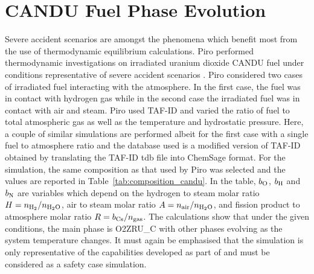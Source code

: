 \section{CANDU Fuel Phase Evolution}
Severe accident scenarios are amongst the phenomena which benefit most from the use of thermodynamic equilibrium calculations. Piro performed thermodynamic investigations on irradiated uranium dioxide CANDU fuel under conditions representative of severe accident scenarios \cite{Piro:2022aa}. Piro considered two cases of irradiated fuel interacting with the atmosphere. In the first case, the fuel was in contact with hydrogen gas while in the second case the irradiated fuel was in contact with air and steam.  Piro used TAF-ID \cite{Gueneau15,Gueneau:2021aa} and varied the ratio of fuel to total atmospheric gas as well as the temperature and hydrostatic pressure. Here, a couple of similar simulations are performed albeit for the first case with a single fuel to atmosphere ratio and the database used is a modified version of TAF-ID obtained by translating the TAF-ID tdb file into ChemSage format. For the simulation, the same composition as that used by Piro was selected and the values are reported in Table~\ref{tab:composition_candu}. In the table, $b_{\ce{O}}$, $b_{\ce{H}}$ and $b_{\ce{N}}$ are variables which depend on the hydrogen to steam molar ratio $H = n_{\ce{H2}} / n_{\ce{H2O}}$, air to steam molar ratio $A = n_{\text{air}} / n_{\ce{H2O}}$, and fission product to atmosphere molar ratio $R = b_{\ce{Cs}} / n_{\text{gas}}$. The calculations show that under the given conditions, the main phase is O2ZRU\_C with other phases evolving as the system temperature changes. It must again be emphasised that the simulation is only representative of the capabilities developed as part of {\GEM} and must be considered as a safety case simulation. 

